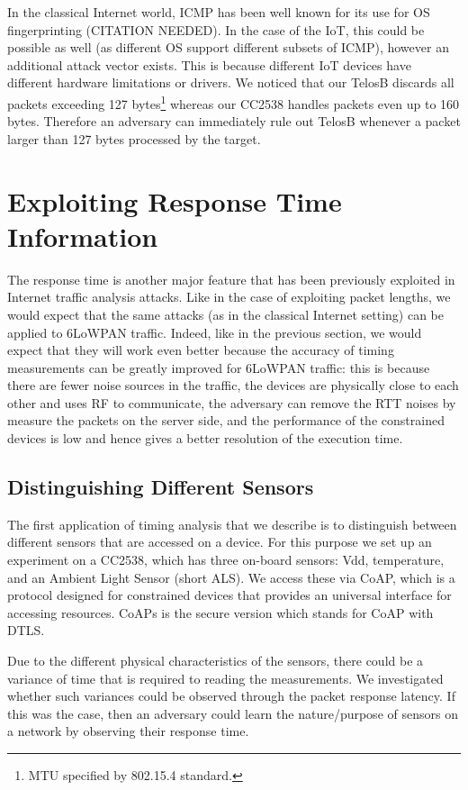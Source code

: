 \documentclass{article}
\begin{document}
In the classical Internet world, ICMP has been well known for its use for OS fingerprinting (CITATION NEEDED). In the case of the IoT, this could be possible as well (as different OS support different subsets of ICMP), however an additional attack vector exists. This is because different IoT devices have different hardware limitations or drivers. We noticed that our TelosB\cite{TelosB} discards all packets exceeding 127 bytes\footnote{MTU specified by 802.15.4 standard.} whereas our CC2538 handles packets even up to 160 bytes. Therefore an adversary can immediately rule out TelosB whenever a packet larger than 127 bytes processed by the target.


\section{Exploiting Response Time Information}

The response time is another major feature that has been previously exploited in Internet traffic analysis attacks. Like in the case of exploiting packet lengths, we would expect that the same attacks (as in the classical Internet setting) can be applied to 6LoWPAN traffic. Indeed, like in the previous section, we would expect that they will work even better because the accuracy of timing measurements can be greatly improved for 6LoWPAN traffic: this is because there are fewer noise sources in the traffic, the devices are physically close to each other and uses RF to communicate, the adversary can remove the RTT noises by measure the packets on the server side, and the performance of the constrained devices is low and hence gives a better resolution of the execution time.

\subsection{Distinguishing Different Sensors}
The first application of timing analysis that we describe is to distinguish between different sensors that are accessed on a device. For this purpose we set up an experiment on a CC2538, which has three on-board sensors: Vdd, temperature, and an Ambient Light Sensor (short ALS). We access these via CoAP\cite{rfc7252}, which is a protocol designed for constrained devices that provides an universal interface for accessing resources. CoAPs is the secure version which stands for CoAP with DTLS.

Due to the different physical characteristics of the sensors, there could be a variance of time that is required to reading the measurements. We investigated whether such variances could be observed through the packet response latency. If this was the case, then an adversary could learn the nature/purpose of sensors on a network by observing their response time. 
\end{document}
